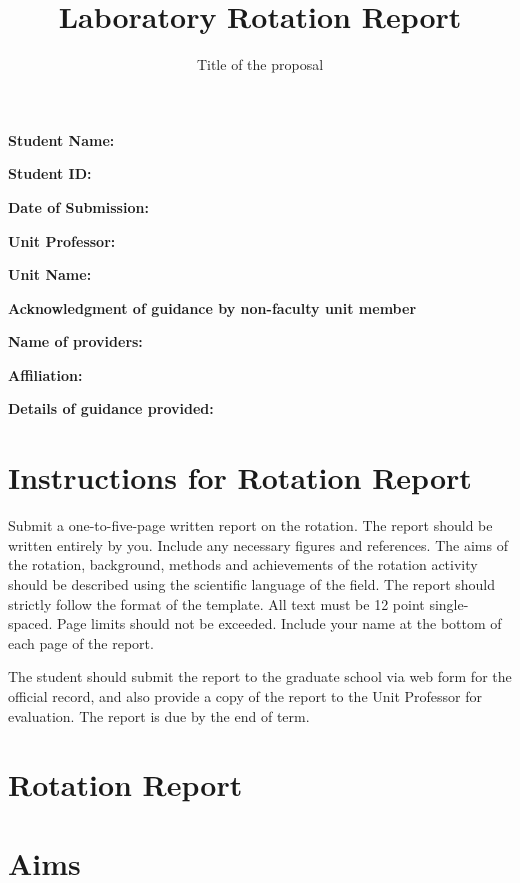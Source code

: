 \documentclass[paper=a4wide, fontsize=12pt]{scrartcl}	 %
\title{\vspace{-1.8cm}  \color{DarkRed} Laboratory Rotation Report}
\subtitle{Title of the proposal %
\vspace{-2cm} }
\date{} %
\begin{document}
\maketitle %
\thispagestyle{fancy} %


\vspace{-0.5cm} \textbf{Student Name:}

\textbf{Student ID:}

\textbf{Date of Submission:}

\textbf{Unit Professor:}

\textbf{Unit Name:}

\vspace{3mm} \textbf{Acknowledgment of guidance by non-faculty unit member}

\textbf{Name of providers:}

\textbf{Affiliation:}

\textbf{Details of guidance provided:}


\vspace{0.5cm}

\section*{Instructions for Rotation Report}

Submit a one-to-five-page written report on the rotation. The report should be written entirely by you. Include any necessary figures and references. The aims of the rotation, background, methods and achievements of the rotation activity should be described using the scientific language of the field. 
The report should strictly follow the format of the template. All text must be 12 point single-spaced. Page limits should not be exceeded. Include your name at the bottom of each page of the report.

The student should submit the report to the graduate school via web form for the official record, and also provide a copy of the report to the Unit Professor for evaluation. The report is due by the end of term. 


\section*{Rotation Report}


\section*{Aims}
\end{document}
